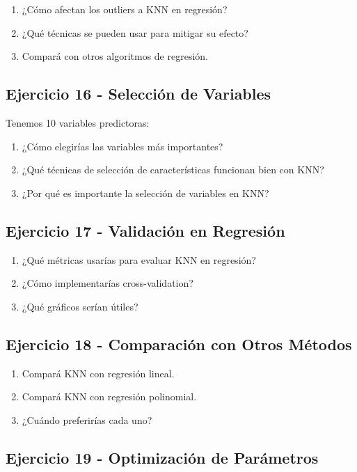 \documentclass[12pt]{article}
\begin{document}
\begin{enumerate}
    \item ¿Cómo afectan los outliers a KNN en regresión?
    \item ¿Qué técnicas se pueden usar para mitigar su efecto?
    \item Compará con otros algoritmos de regresión.
\end{enumerate}

\subsection{Ejercicio 16 - Selección de Variables}

Tenemos 10 variables predictoras:

\begin{enumerate}
    \item ¿Cómo elegirías las variables más importantes?
    \item ¿Qué técnicas de selección de características funcionan bien con KNN?
    \item ¿Por qué es importante la selección de variables en KNN?
\end{enumerate}

\subsection{Ejercicio 17 - Validación en Regresión}

\begin{enumerate}
    \item ¿Qué métricas usarías para evaluar KNN en regresión?
    \item ¿Cómo implementarías cross-validation?
    \item ¿Qué gráficos serían útiles?
\end{enumerate}

\subsection{Ejercicio 18 - Comparación con Otros Métodos}

\begin{enumerate}
    \item Compará KNN con regresión lineal.
    \item Compará KNN con regresión polinomial.
    \item ¿Cuándo preferirías cada uno?
\end{enumerate}

\subsection{Ejercicio 19 - Optimización de Parámetros}
\end{document}
